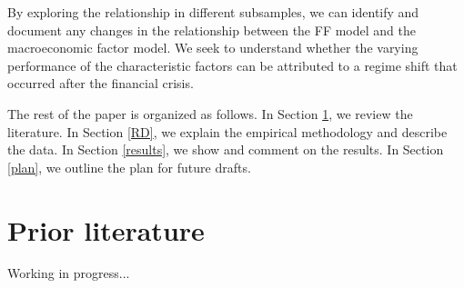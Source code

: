 \documentclass[11pt,halfline,a4paper]{ouparticle}
\begin{document}
By exploring the relationship in different subsamples, we can identify and document any changes in the relationship between the FF model and the macroeconomic factor model. We seek to understand whether the varying performance of the characteristic factors can be attributed to a regime shift that occurred after the financial crisis.



The rest of the paper is organized as follows. In Section \ref{literature}, we review the literature. In Section \ref{RD}, we explain the empirical methodology and describe the data. In Section \ref{results}, we show and comment on the results. In Section \ref{plan}, we outline the plan for future drafts.

\section{Prior literature}
\label{literature}

Working in progress...



\end{document}
